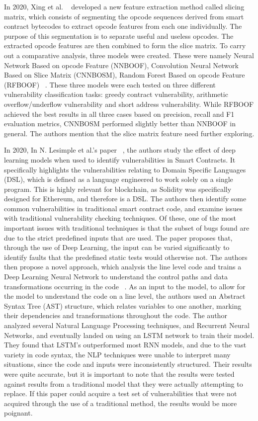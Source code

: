 In 2020, Xing et al. ~\cite{hu2021comprehensive} developed a new feature extraction method called slicing matrix, which consists of segmenting the opcode sequences derived from smart contract bytecodes to extract opcode features from each one individually.
The purpose of this segmentation is to separate useful and useless opcodes.
The extracted opcode features are then combined to form the slice matrix.
To carry out a comparative analysis, three models were created.
These were namely Neural Network Based on opcode Feature (NNBOOF), Convolution Neural Network Based on Slice Matrix (CNNBOSM), Random Forest Based on opcode Feature (RFBOOF) ~\cite{hu2021comprehensive}.
These three models were each tested on three different vulnerability classification tasks: greedy contract vulnerability, arithmetic overflow/underflow vulnerability and short address vulnerability.
While RFBOOF achieved the best results in all three cases based on precision, recall and F1 evaluation metrics, CNNBOSM performed slightly better than NNBOOF in general.
The authors mention that the slice matrix feature need further exploring.

In 2020, In N. Lesimple et al.'s paper ~\cite{day2019ethereum}, the authors study the effect of deep learning models when used to identify vulnerabilities in Smart Contracts.
It specifically highlights the vulnerabilities relating to Domain Specific Languages (DSL), which is defined as a language engineered to work solely on a single program.
This is highly relevant for blockchain, as Solidity was specifically designed for Ethereum, and therefore is a DSL.
The authors then identify some common vulnerabilities in traditional smart contract code, and examine issues with traditional vulnerability checking techniques.
Of these, one of the most important issues with traditional techniques is that the subset of bugs found are due to the strict predefined inputs that are used.
The paper proposes that, through the use of Deep Learning, the input can be varied significantly to identify faults that the predefined static tests would otherwise not.
The authors then propose a novel approach, which analysis the line level code and trains a Deep Learning Neural Network to understand the control paths and data transformations occurring in the code ~\cite{day2019ethereum}.
As an input to the model, to allow for the model to understand the code on a line level, the authors used an Abstract Syntax Tree (AST) structure, which relates variables to one another, marking their dependencies and transformations throughout the code.
The author analyzed several Natural Language Processing techniques, and Recurrent Neural Networks, and eventually landed on using an LSTM network to train their model.
They found that LSTM's outperformed most RNN models, and due to the vast variety in code syntax, the NLP techniques were unable to interpret many situations, since the code and inputs were inconsistently structured.
Their results were quite accurate, but it is important to note that the results were tested against results from a traditional model that they were actually attempting to replace.
If this paper could acquire a test set of vulnerabilities that were not acquired through the use of a traditional method, the results would be more poignant.

